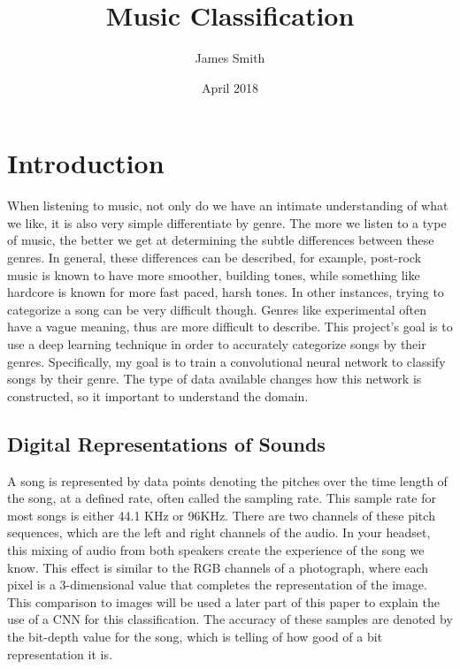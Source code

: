 \documentclass{article}
\title{Music Classification}
\author{James Smith}
\date{April 2018}
\begin{document}
\maketitle

\section{Introduction}
When listening to music, not only do we have an intimate understanding of what we like, it is also very simple differentiate by genre. The more we listen to a type of music, the better we get at determining the subtle differences between these genres. In general, these differences can be described, for example, post-rock music is known to have more smoother, building tones, while something like hardcore is known for more fast paced, harsh tones. In other instances, trying to categorize a song can be very difficult though. Genres like experimental often have a vague meaning, thus are more difficult to describe. This project's goal is to use a deep learning technique in order to accurately categorize songs by their genres. Specifically, my goal is to train a convolutional neural network to classify songs by their genre. The type of data available changes how this network is constructed, so it important to understand the domain.
\subsection{Digital Representations of Sounds}
 A song is represented by data points denoting the pitches over the time length of the song, at a defined rate, often called the sampling rate.  This sample rate for most songs is either 44.1 KHz or 96KHz. There are two channels of these pitch sequences, which are the left and right channels of the audio. In your headset, this mixing of audio from both speakers create the experience of the song we know. This effect is similar to the RGB channels of a photograph, where each pixel is a 3-dimensional value that completes the representation of the image. This comparison to images will be used a later part of this paper to explain the use of a CNN for this classification. The accuracy of these samples are denoted by the bit-depth value for the song, which is telling of how good of a bit representation it is.
\end{document}
